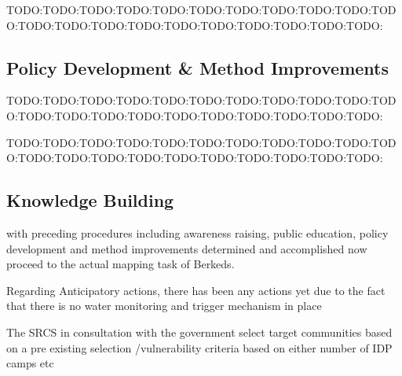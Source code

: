 TODO:TODO:TODO:TODO:TODO:TODO:TODO:TODO:TODO:TODO:TODO:TODO:TODO:TODO:TODO:TODO:TODO:TODO:TODO:TODO:TODO:

\subsection{Policy Development \& Method Improvements}
TODO:TODO:TODO:TODO:TODO:TODO:TODO:TODO:TODO:TODO:TODO:TODO:TODO:TODO:TODO:TODO:TODO:TODO:TODO:TODO:TODO:
























TODO:TODO:TODO:TODO:TODO:TODO:TODO:TODO:TODO:TODO:TODO:TODO:TODO:TODO:TODO:TODO:TODO:TODO:TODO:TODO:TODO:
\subsection{Knowledge Building}
with preceding procedures including awareness raising, public education, policy development and method improvements determined and accomplished now proceed to the actual mapping task of Berkeds.






Regarding Anticipatory actions, there has been any actions yet due to the fact that there is no water monitoring and trigger mechanism in place %

The SRCS in consultation with the government select target communities based on a pre existing selection /vulnerability criteria based on either number of IDP camps etc

